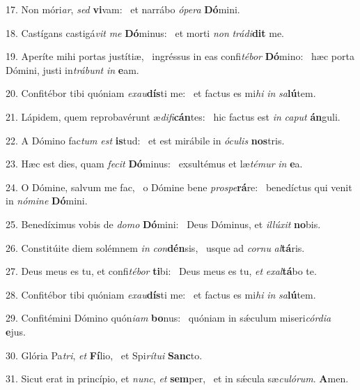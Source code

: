 17. Non móri\textit{ar}, \textit{sed} \textbf{vi}vam: \ast\  et narrábo \textit{ó}\textit{pe}\textit{ra} \textbf{Dó}mini.\

18. Castígans castigá\textit{vit} \textit{me} \textbf{Dó}minus: \ast\  et morti \textit{non} \textit{trá}\textit{di}\textbf{dit} me.\

19. Aperíte mihi portas justítiæ, \dag\  ingréssus in eas confi\textit{té}\textit{bor} \textbf{Dó}mino: \ast\  hæc porta Dómini, justi in\textit{trá}\textit{bunt} \textit{in} \textbf{e}am.\

20. Confitébor tibi quóniam \textit{ex}\textit{au}\textbf{dís}ti me: \ast\  et factus es mi\textit{hi} \textit{in} \textit{sa}\textbf{lú}tem.\

21. Lápidem, quem reprobavérunt æ\textit{di}\textit{fi}\textbf{cán}tes: \ast\  hic factus est \textit{in} \textit{ca}\textit{put} \textbf{án}guli.\

22. A Dómino fac\textit{tum} \textit{est} \textbf{is}tud: \ast\  et est mirábile in \textit{ó}\textit{cu}\textit{lis} \textbf{nos}tris.\

23. Hæc est dies, quam \textit{fe}\textit{cit} \textbf{Dó}minus: \ast\  exsultémus et læ\textit{té}\textit{mur} \textit{in} \textbf{e}a.\

24. O Dómine, salvum me fac, \dag\  o Dómine bene \textit{pro}\textit{spe}\textbf{rá}re: \ast\  benedíctus qui venit in \textit{nó}\textit{mi}\textit{ne} \textbf{Dó}mini.\

25. Benedíximus vobis de \textit{do}\textit{mo} \textbf{Dó}mini: \ast\  Deus Dóminus, et \textit{il}\textit{lú}\textit{xit} \textbf{no}bis.\

26. Constitúite diem solémnem \textit{in} \textit{con}\textbf{dén}sis, \ast\  usque ad \textit{cor}\textit{nu} \textit{al}\textbf{tá}ris.\

27. Deus meus es tu, et confi\textit{té}\textit{bor} \textbf{ti}bi: \ast\  Deus meus es tu, \textit{et} \textit{ex}\textit{al}\textbf{tá}bo te.\

28. Confitébor tibi quóniam \textit{ex}\textit{au}\textbf{dís}ti me: \ast\  et factus es mi\textit{hi} \textit{in} \textit{sa}\textbf{lú}tem.\

29. Confitémini Dómino quón\textit{i}\textit{am} \textbf{bo}nus: \ast\  quóniam in sǽculum miseri\textit{cór}\textit{di}\textit{a} \textbf{e}jus.\

30. Glória Pa\textit{tri}, \textit{et} \textbf{Fí}lio, \ast\  et Spi\textit{rí}\textit{tu}\textit{i} \textbf{Sanc}to.\

31. Sicut erat in princípio, et \textit{nunc}, \textit{et} \textbf{sem}per, \ast\  et in sǽcula sæ\textit{cu}\textit{ló}\textit{rum}. \textbf{A}men.\

